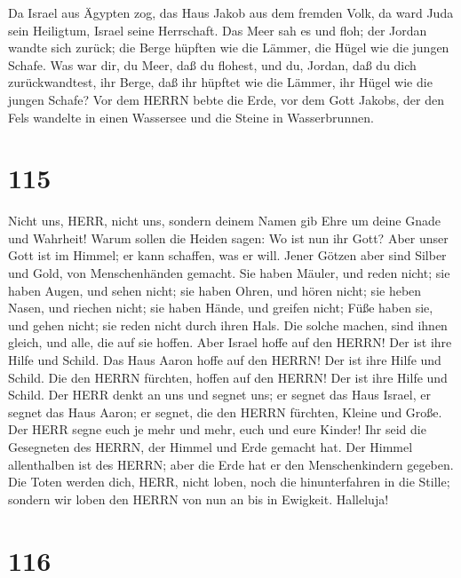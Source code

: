  Da Israel aus Ägypten zog, das Haus Jakob aus dem fremden
Volk,  da ward Juda sein Heiligtum, Israel seine Herrschaft.
 Das Meer sah es und floh; der Jordan wandte sich zurück;
 die Berge hüpften wie die Lämmer, die Hügel wie die jungen
Schafe.  Was war dir, du Meer, daß du flohest, und du,
Jordan, daß du dich zurückwandtest,  ihr Berge, daß ihr
hüpftet wie die Lämmer, ihr Hügel wie die jungen Schafe? 
Vor dem HERRN bebte die Erde, vor dem Gott Jakobs,  der den
Fels wandelte in einen Wassersee und die Steine in Wasserbrunnen.

\hypertarget{section-114}{%
\section{115}\label{section-114}}

 Nicht uns, HERR, nicht uns, sondern deinem Namen gib Ehre
um deine Gnade und Wahrheit!  Warum sollen die Heiden sagen:
Wo ist nun ihr Gott?  Aber unser Gott ist im Himmel; er kann
schaffen, was er will.  Jener Götzen aber sind Silber und
Gold, von Menschenhänden gemacht.  Sie haben Mäuler, und
reden nicht; sie haben Augen, und sehen nicht;  sie haben
Ohren, und hören nicht; sie heben Nasen, und riechen nicht; 
sie haben Hände, und greifen nicht; Füße haben sie, und gehen nicht; sie
reden nicht durch ihren Hals.  Die solche machen, sind ihnen
gleich, und alle, die auf sie hoffen.  Aber Israel hoffe auf
den HERRN! Der ist ihre Hilfe und Schild.  Das Haus Aaron
hoffe auf den HERRN! Der ist ihre Hilfe und Schild.  Die
den HERRN fürchten, hoffen auf den HERRN! Der ist ihre Hilfe und Schild.
 Der HERR denkt an uns und segnet uns; er segnet das Haus
Israel, er segnet das Haus Aaron;  er segnet, die den HERRN
fürchten, Kleine und Große.  Der HERR segne euch je mehr
und mehr, euch und eure Kinder!  Ihr seid die Gesegneten
des HERRN, der Himmel und Erde gemacht hat.  Der Himmel
allenthalben ist des HERRN; aber die Erde hat er den Menschenkindern
gegeben.  Die Toten werden dich, HERR, nicht loben, noch
die hinunterfahren in die Stille;  sondern wir loben den
HERRN von nun an bis in Ewigkeit. Halleluja!

\hypertarget{section-115}{%
\section{116}\label{section-115}}

